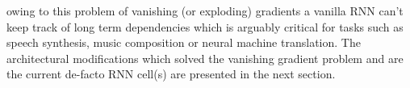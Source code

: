 owing to this problem of vanishing (or exploding) gradients a vanilla RNN can't keep track of long term dependencies which is arguably critical for tasks such as speech synthesis, music composition or neural machine translation. The architectural modifications which solved the vanishing gradient problem and are the current de-facto RNN cell(s) are presented in the next section.

